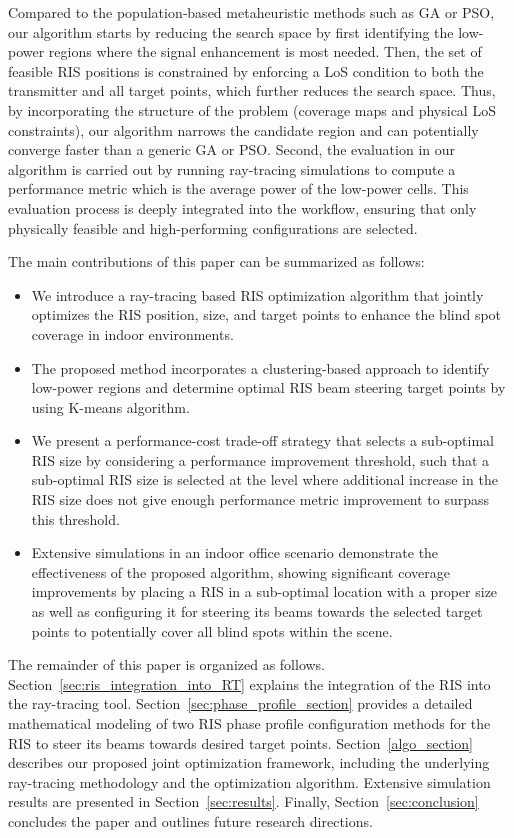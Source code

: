 \documentclass{IEEEoj}
\begin{document}
Compared to the population‐based metaheuristic methods such as GA or PSO, our algorithm starts by reducing the search space by first identifying the low-power regions where the signal enhancement is most needed. Then, the set of feasible RIS positions is constrained by enforcing a LoS condition to both the transmitter and all target points, which further reduces the search space. Thus, by incorporating the structure of the problem (coverage maps and physical LoS constraints), our algorithm narrows the candidate region and can potentially converge faster than a generic GA or PSO. Second, the evaluation in our algorithm is carried out by running ray-tracing simulations to compute a performance metric which is the average power of the low-power cells. This evaluation process is deeply integrated into the workflow, ensuring that only physically feasible and high-performing configurations are selected.

The main contributions of this paper can be summarized as follows:
\begin{itemize}
	\item We introduce a ray-tracing based RIS optimization algorithm that jointly optimizes the RIS position, size, and target points to enhance the blind spot coverage in indoor environments.
	\item The proposed method incorporates a clustering-based approach to identify low-power regions and determine optimal RIS beam steering target points by using K-means algorithm.
	\item We present a performance-cost trade-off strategy that selects a sub-optimal RIS size by considering a performance improvement threshold, such that a sub-optimal RIS size is selected at the level where additional increase in the RIS size does not give enough performance metric improvement to surpass this threshold.
	\item Extensive simulations in an indoor office scenario demonstrate the effectiveness of the proposed algorithm, showing significant coverage improvements by placing a RIS in a sub-optimal location with a proper size as well as configuring it for steering its beams towards the selected target points to potentially cover all blind spots within the scene.
\end{itemize}

The remainder of this paper is organized as follows. Section~\ref{sec:ris_integration_into_RT} explains the integration of the RIS into the ray-tracing tool. Section~\ref{sec:phase_profile_section} provides a detailed mathematical modeling of two RIS phase profile configuration methods for the RIS to steer its beams towards desired target points. Section~\ref{algo_section} describes our proposed joint optimization framework, including the underlying ray-tracing methodology and the optimization algorithm. Extensive simulation results are presented in Section~\ref{sec:results}. Finally, Section~\ref{sec:conclusion} concludes the paper and outlines future research directions.
\end{document}
